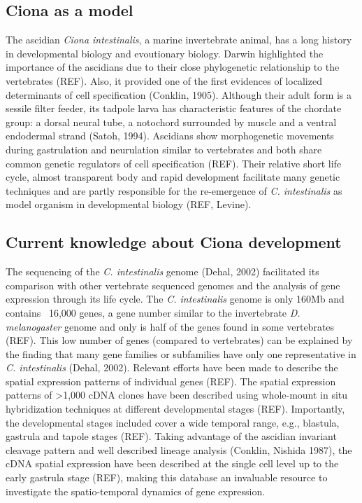\subsection{Ciona as a model}
	The ascidian \textit{Ciona intestinalis}, a marine invertebrate animal, has a long history in developmental biology and evoutionary biology. 
	Darwin highlighted the importance of the ascidians due to their  close phylogenetic relationship to the vertebrates (REF). 
	Also, it provided one of the first evidences of localized determinants of cell specification (Conklin, 1905). 
	Although their adult form is a sessile filter feeder, its tadpole larva has characteristic features of the chordate group: a dorsal neural tube, a notochord surrounded by muscle and a ventral endodermal strand (Satoh, 1994).
	Ascidians show morphogenetic movements during gastrulation and neurulation similar to vertebrates and both share common genetic regulators of cell specification (REF).
	Their relative short life cycle, almost transparent body and rapid development facilitate many genetic techniques and are partly responsible for the re-emergence of \textit{C. intestinalis} as model organism in developmental biology (REF, Levine). 

\subsection{Current knowledge about Ciona development}
	The sequencing of the \textit{C. intestinalis} genome (Dehal, 2002) facilitated its comparison with other vertebrate sequenced genomes and the analysis of gene expression through its life cycle.
	The \textit{C. intestinalis} genome is only 160Mb and contains ~16,000 genes, a gene number similar to the invertebrate \textit{D. melanogaster} genome and only is half of the genes found in some vertebrates (REF).
	This low number of genes (compared to vertebrates) can be explained by the finding that many gene families or subfamilies have only one representative in \textit{C. intestinalis} (Dehal, 2002).
	Relevant efforts have been made to describe the spatial expression patterns of individual genes (REF).
	The spatial expression patterns of  >1,000 cDNA clones have been described using whole-mount in situ hybridization techniques at different developmental stages (REF).
	 Importantly, the developmental stages included cover a wide temporal range, e.g., blastula, gastrula and tapole stages (REF).
	 Taking advantage of the ascidian invariant cleavage pattern and well described lineage analysis (Conklin, Nishida 1987), the cDNA spatial expression have been described at the single cell level up to the early gastrula stage (REF), making this database an invaluable resource to investigate the spatio-temporal dynamics of gene expression.





